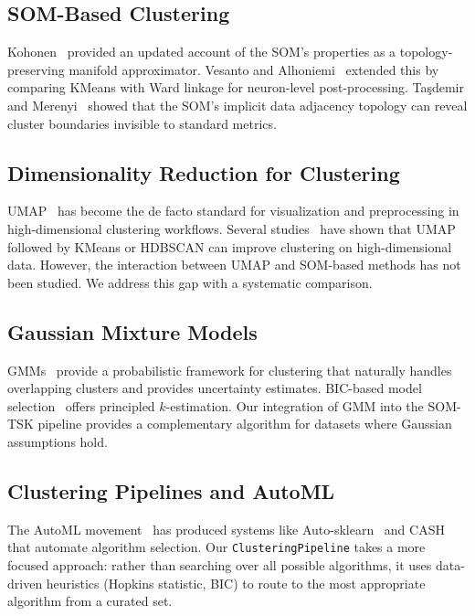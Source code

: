\documentclass[journal]{IEEEtran}
\begin{document}
\subsection{SOM-Based Clustering}

Kohonen~\cite{kohonen2013essentials} provided an updated account of the SOM's properties as a topology-preserving manifold approximator. Vesanto and Alhoniemi~\cite{vesanto2000clustering} extended this by comparing KMeans with Ward linkage for neuron-level post-processing. Ta\c{s}demir and Merenyi~\cite{tasdemir2009exploiting} showed that the SOM's implicit data adjacency topology can reveal cluster boundaries invisible to standard metrics.

\subsection{Dimensionality Reduction for Clustering}

UMAP~\cite{mcinnes2018umap} has become the de facto standard for visualization and preprocessing in high-dimensional clustering workflows. Several studies~\cite{allaoui2020considerably,kobak2021initialization} have shown that UMAP followed by KMeans or HDBSCAN can improve clustering on high-dimensional data. However, the interaction between UMAP and SOM-based methods has not been studied. We address this gap with a systematic comparison.

\subsection{Gaussian Mixture Models}

GMMs~\cite{fraley2002model,mclachlan2019finite} provide a probabilistic framework for clustering that naturally handles overlapping clusters and provides uncertainty estimates. BIC-based model selection~\cite{schwarz1978estimating} offers principled $k$-estimation. Our integration of GMM into the SOM-TSK pipeline provides a complementary algorithm for datasets where Gaussian assumptions hold.

\subsection{Clustering Pipelines and AutoML}

The AutoML movement~\cite{hutter2019automated} has produced systems like Auto-sklearn~\cite{feurer2015efficient} and CASH~\cite{thornton2013auto} that automate algorithm selection. Our \texttt{ClusteringPipeline} takes a more focused approach: rather than searching over all possible algorithms, it uses data-driven heuristics (Hopkins statistic, BIC) to route to the most appropriate algorithm from a curated set.
\end{document}
